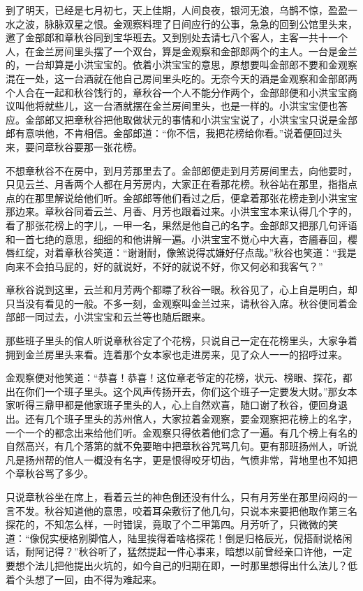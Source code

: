 \documentclass[12pt,UTF8]{ctexbook}
\begin{document}
{{{到了明天，已经是七月初七，天上佳期，人间良夜，银河无浪，乌鹊不惊，盈盈一水之波，脉脉双星之恨。金观察料理了日间应行的公事，急急的回到公馆里头来，邀了金部郎和章秋谷同到宝华班去。又到别处去请七八个客人，主客一共十一个人，在金兰房间里头摆了一个双台，算是金观察和金部郎两个的主人。一台是金兰的，一台却算是小洪宝宝的。依着小洪宝宝的意思，原想要叫金部郎不要和金观察混在一处，这一台酒就在他自己房间里头吃的。无奈今天的酒是金观察和金部郎两个人合在一起和秋谷饯行的，章秋谷一个人不能分作两个，金部郎便和小洪宝宝商议叫他将就些儿，这一台酒就摆在金兰房间里头，也是一样的。小洪宝宝便也答应。金部郎又把章秋谷把他取做状元的事情和小洪宝宝说了，小洪宝宝只说是金部郎有意哄他，不肯相信。金部郎道：“你不信，我把花榜给你看。”说着便回过头来，要问章秋谷要那一张花榜。

不想章秋谷不在房中，到月芳那里去了。金部郎便走到月芳房间里去，向他要时，只见云兰、月香两个人都在月芳房内，大家正在看那花榜。秋谷站在那里，指指点点的在那里解说给他们听。金部郎等他们看过之后，便拿着那张花榜走到小洪宝宝那边来。章秋谷同着云兰、月香、月芳也跟着过来。小洪宝宝本来认得几个字的，看了那张花榜上的字儿，一甲一名，果然是他自己的名字。金部郎又把那几句评语和一首七绝的意思，细细的和他讲解一遍。小洪宝宝不觉心中大喜，杏靥春回，樱唇红绽，对着章秋谷笑道：“谢谢耐，像煞说得忒嫌好仔点哉。”秋谷也笑道：“我是向来不会拍马屁的，好的就说好，不好的就说不好，你又何必和我客气？”

章秋谷说到这里，云兰和月芳两个都瞟了秋谷一眼。秋谷见了，心上自是明白，却只当没有看见的一般。不多一刻，金观察叫金兰过来，请秋谷入席。秋谷便同着金部郎一同过去，小洪宝宝和云兰等也随后跟来。

那些班子里头的倌人听说章秋谷定了个花榜，只说自己一定在花榜里头，大家争着拥到金兰房里头来看。连着那个女本家也走进房来，见了众人一一的招呼过来。

金观察便对他笑道：“恭喜！恭喜！这位章老爷定的花榜，状元、榜眼、探花，都出在你们一个班子里头。这个风声传扬开去，你们这个班子一定要发大财。”那女本家听得三鼎甲都是他家班子里头的人，心上自然欢喜，随口谢了秋谷，便回身退出。还有几个班子里头的苏州倌人，大家拉着金观察，要金观察把花榜上的名字，一个一个的都念出来给他们听。金观察只得依着他们念了一遍。有几个榜上有名的自然高兴，有几个落第的就不免要暗中把章秋谷咒骂几句。更有那班扬州人，听说凡是扬州帮的倌人一概没有名字，更是恨得咬牙切齿，气愤非常，背地里也不知把个章秋谷骂了多少。

只说章秋谷坐在席上，看着云兰的神色倒还没有什么，只有月芳坐在那里闷闷的一言不发。秋谷知道他的意思，咬着耳朵敷衍了他几句，只说本来要把他取作第三名探花的，不知怎么样，一时错误，竟取了个二甲第四。月芳听了，只微微的笑道：“像倪实梗格别脚倌人，陆里挨得着啥格探花！倒是归格辰光，倪搭耐说格闲话，耐阿记得？”秋谷听了，猛然提起一件心事来，暗想以前曾经亲口许他，一定要想个法儿把他提出火坑的，如今自己的归期在即，一时那里想得出什么法儿？低着个头想了一回，由不得为难起来。

}}}
\end{document}
